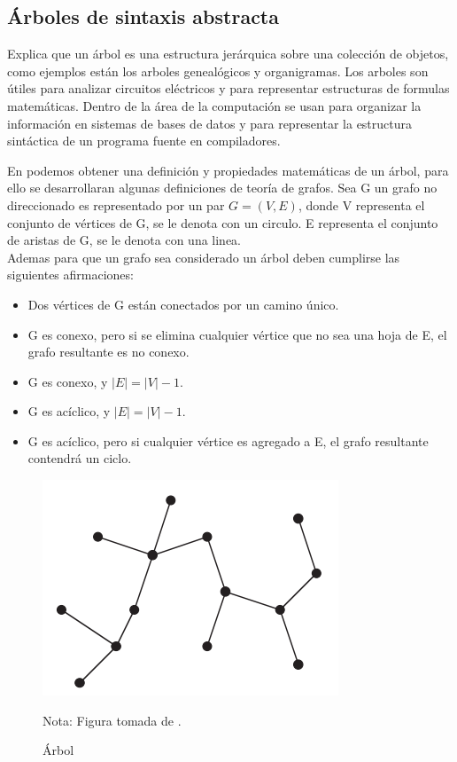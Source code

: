 \subsection{Árboles de sintaxis abstracta}
\cite{Aho1999} Explica que un árbol es una estructura jerárquica sobre una colección de objetos, como ejemplos están los arboles genealógicos y organigramas. Los arboles son útiles para analizar circuitos eléctricos y para representar estructuras de formulas matemáticas. Dentro de la área de la computación se usan para organizar la información en sistemas de bases de datos y para representar la estructura sintáctica de un programa fuente en compiladores.

En \cite{Cormen2009} podemos obtener una definición y propiedades matemáticas de un árbol, para ello se desarrollaran algunas definiciones de teoría de grafos. Sea G un grafo no direccionado es representado por un par $G=(V,E)$, donde V representa el conjunto de vértices de G, se le denota con un circulo. E representa el conjunto de aristas de G, se le denota con una linea.\\
Ademas para que un grafo sea considerado un árbol deben cumplirse las siguientes afirmaciones:
\begin{itemize}
    \item Dos vértices de G están conectados por un camino único.
    \item G es conexo, pero si se elimina cualquier vértice que no sea una hoja de E, el grafo resultante es no conexo.
    \item G es conexo, y $|E| = |V|-1$.
    \item G es acíclico, y $|E| = |V|-1$.
    \item G es acíclico, pero si cualquier vértice es agregado a E, el grafo resultante contendrá un ciclo.
\end{itemize}
\begin{figure}[ht!]
\centering
\includegraphics[scale=0.8]{imagenes/arbol1}
\caption{Árbol}
Nota: Figura tomada de \cite{Cormen2009}.
\label{arbol1}
\end{figure}


